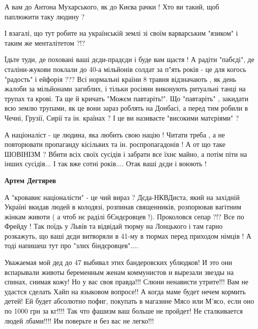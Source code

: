 \begin{itemize}
\begin{itemize}
\begin{itemize}
А вам до Антона Мухарського, як до Києва рачки ! Хто ви такий, щоб паплюжити
таку людину ? 

І взагалі, що тут робите на українській землі зі своїм варварським "язиком" і
таким же менталітетом ?!? 

Їдьте туди, де поховані ваші дєди-прадєди і буде вам щастя ! А радіти "пабєді",
де сталіни-жукови поклали до 40-а мільйонів солдат за п"ять років - це для
когось "радость" і ейфорія ??? Всі нормальні країни 8 травня відзначають , як
день жалоби за мільйонами загиблих, і тільки росіяни виконують ритуальні танці
на трупах та крові. Та ще й кричать "Можєм павтаріть!". Що "павтаріть" ,
закидати всю землю трупами, як це вони зараз роблять на Донбасі, а перед тим
робили в Чечні, Грузії, Сирії та ін.  країнах ? І це ви називаєте "високими
матєріями" ? 

А націоналіст - це людина, яка любить свою націю ! Читати треба , а не
повторювати пропаганду кісільвих та ін. роспропагадонів ! А от що таке ШОВІНІЗМ
? Вбити всіх своїх сусідів і забрати все їхнє майно, а потім піти на інших
сусідів... І так вже сотні років.... Отак ваші дєди і воюють !

 
\textbf{Артем Дегтярев} 

А "кровавиє націоналісти" - це чий вираз ? Дєда-НКВДиста, який на західній
Україні вкидав людей в колодязі, розпинав священників, розпорював вагітним
жінкам животи ( а чтоб нє раділі бЄндєровцев !). Проколовся сепар ?!? Все по
Фрейду ! Так поїдь у Львів та відвідай тюрму на Лонцького і там гарно
розкажуть, що ваші дєди витворяли в 41-му в тюрмах перед приходом німців ! А
тоді напишеш тут про "злих біндєровцев"....

 

Уважаемая мой дед до 47 выбивал этих бандеровских ублюдков! И это они
вспарывали животы беременным женам коммунистов и вырезали звезды на спинах,
снимая кожу! Но у вас своя правда!!! Слюни ненависти утрите!!! Вам не удастся
сделать Хайп на языковом вопросе!! А когда маме будет нечем кормить детей! Ей
будет абсолютно пофиг, покупать в магазине Мясо или М'ясо, если оно по 1000 грн
за кг!!!! Так что фашизм ваш больше не пройдет! Не сталкивается людей лбами!!!!
Им поверьте и без вас не легко!!!


\end{itemize}
\end{itemize}
\end{itemize}

